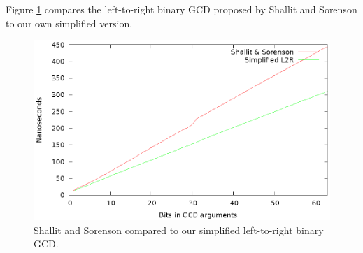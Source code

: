 \documentclass{ucalgthes1}
\theoremstyle{definition}
\begin{document}
Figure \ref{fig:shallit-vs-binary_l2r} compares the left-to-right binary GCD proposed by Shallit and Sorenson to our own simplified version.  
\begin{figure}[H]
\centering
\includegraphics{shallit-vs-binary_l2r}
\caption{Shallit and Sorenson compared to our simplified left-to-right binary GCD.}
\label{fig:shallit-vs-binary_l2r}
\end{figure}
\end{document}
